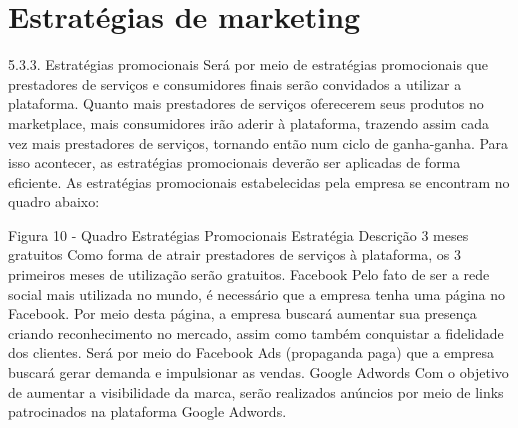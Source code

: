 \section{\textbf{Estratégias de marketing}}
\label{sec: Estratégias de marketing}


\begin{commentA}

\par \end{commentA}

5.3.3. Estratégias promocionais 
Será por meio de estratégias promocionais que prestadores de serviços e consumidores finais serão convidados a utilizar a plataforma. Quanto mais prestadores de serviços oferecerem seus produtos no marketplace, mais consumidores irão aderir à plataforma, trazendo assim cada vez mais prestadores de serviços, tornando então num ciclo de ganha-ganha. Para isso acontecer, as estratégias promocionais deverão ser aplicadas de forma eficiente.  
As estratégias promocionais estabelecidas pela empresa se encontram no quadro abaixo: 

Figura 10 - Quadro Estratégias Promocionais 
Estratégia 	Descrição 
3 meses gratuitos 	Como forma de atrair prestadores de serviços à plataforma, os 3 primeiros meses de utilização serão gratuitos. 
Facebook 	Pelo fato de ser a rede social mais utilizada no mundo, é necessário que a empresa tenha uma página no Facebook. Por meio desta página, a empresa buscará aumentar sua presença criando reconhecimento no mercado, assim como também conquistar a fidelidade dos clientes. Será por meio do Facebook Ads (propaganda paga) que a empresa buscará gerar demanda 
e impulsionar as vendas. 
Google Adwords 	Com o objetivo de aumentar a visibilidade da marca, serão realizados anúncios por meio de links patrocinados na plataforma Google Adwords. 
